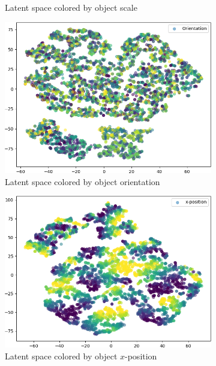 \begin{figure}[H]
\begin{subfigure}{.19\textwidth}
        \caption{Latent space colored by object scale}
    \end{subfigure}
    \hfill
    \begin{subfigure}{.19\textwidth}
        \includegraphics[width=\textwidth]{images/latent_spaces/dsprites/vae_gan/embeddings_mu_2.png}
        \caption{Latent space colored by object orientation}
    \end{subfigure}
    \hfill
    \begin{subfigure}{.19\textwidth}
        \includegraphics[width=\textwidth]{images/latent_spaces/dsprites/vae_gan/embeddings_mu_3.png}
        \caption{Latent space colored by object $x$-position}
    \end{subfigure}
    \hfill
    \begin{subfigure}{.19\textwidth}

\end{subfigure}
\end{figure}
